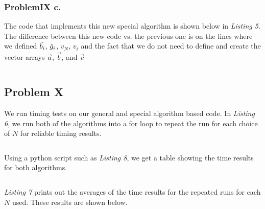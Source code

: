 \documentclass{article}
\begin{document}
\subsubsection*{ProblemIX c.}

The code that implements this new special algorithm is shown below in \textit{Listing 5}. The difference between this new code vs. the previous one is on the lines where we defined $\Tilde{b_i}$, $\Tilde{g}_i$, $v_N$, $v_i$ and the fact that we do not need to define and create the vector arrays $\Vec{a}$, $\Vec{b}$, and $\Vec{c}$


\begin{lstlisting}[label= {listing6},language=C++, caption=C++ Program for Special Algorithm]
\end{lstlisting}


\subsection*{Problem X}

We run timing tests on our general and special algorithm based code. In \textit{Listing 6}, we run both of the algorithms into a for loop to repeat the run for each choice of $N$ for reliable timing results. 


\begin{lstlisting}[label= {listing7},language=C++, caption=C++ Program for Time Test]
\end{lstlisting}
Using a python script such as \textit{Listing 8}, we get a table showing the time results for both algorithms.


\begin{lstlisting}[label= {listing8},language=Python, caption=Python table plot script]
\end{lstlisting}

\textit{Listing 7} prints out the averages of the time results for the repeated runs for each $N$ used. These results are shown below.
\end{document}
